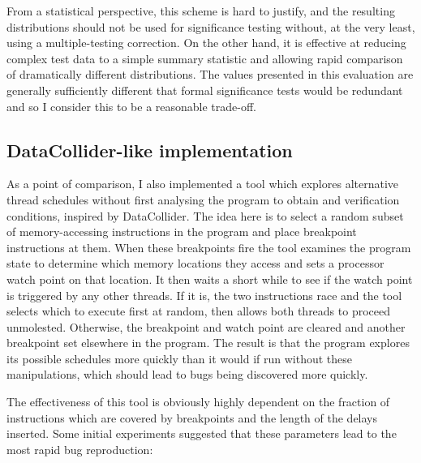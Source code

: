 From a statistical perspective, this scheme is hard to justify, and
the resulting distributions should not be used for significance
testing without, at the very least, using a multiple-testing
correction.  On the other hand, it is effective at reducing complex
test data to a simple summary statistic and allowing rapid comparison
of dramatically different distributions.  The values presented in this
evaluation are generally sufficiently different that formal
significance tests would be redundant and so I consider this to be a
reasonable trade-off.



\subsection{DataCollider-like implementation}
\label{sect:eval:datacollider}

As a point of comparison, I also implemented a tool which explores
alternative thread schedules without first analysing the program to
obtain {\StateMachines} and verification conditions, inspired by
DataCollider\needCite{}.  The idea here is to select a random subset
of memory-accessing instructions in the program and place breakpoint
instructions at them.  When these breakpoints fire the tool examines
the program state to determine which memory locations they access and
sets a processor watch point\needCite{} on that location.  It then
waits a short while to see if the watch point is triggered by any
other threads.  If it is, the two instructions race and the tool
selects which to execute first at random, then allows both threads to
proceed unmolested.  Otherwise, the breakpoint and watch point are
cleared and another breakpoint set elsewhere in the program.  The
result is that the program explores its possible schedules more
quickly than it would if run without these manipulations, which should
lead to bugs being discovered more quickly.

The effectiveness of this tool is obviously highly dependent on the
fraction of instructions which are covered by breakpoints and the
length of the delays inserted.  Some initial experiments suggested that these parameters lead
to the most rapid bug reproduction:

